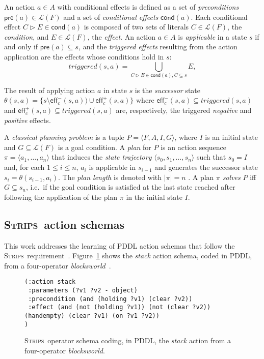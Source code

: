 \documentclass[3p,times]{elsarticle}
\newcommand{\pre}{\mathsf{pre}}  %
\newcommand{\eff}{\mathsf{eff}}  %
\newcommand{\cond}{\mathsf{cond}}   %
\newcommand{\strips}{\textsc{Strips}}     %
\newcommand{\tup}[1]{{\langle #1 \rangle}}
\begin{document}
An action $a\in A$ with conditional effects is defined as a set of {\em preconditions} $\pre(a)\in\mathcal{L}(F)$ and a set of {\em conditional effects} $\cond(a)$. Each conditional effect $C\rhd E\in\cond(a)$ is composed of two sets of literals $C\in\mathcal{L}(F)$, the {\em condition}, and $E\in\mathcal{L}(F)$, the {\em effect}. An action $a\in A$ is {\em applicable} in a state $s$ if and only if $\pre(a)\subseteq s$, and the {\em triggered effects} resulting from the action application are the effects whose conditions hold in $s$:
\[
triggered(s,a)=\bigcup_{C\rhd E\in\cond(a),C\subseteq s} E,
\]

The result of applying action $a$ in state $s$ is the {\em successor} state $\theta(s,a)=\{s\setminus\eff_c^-(s,a))\cup\eff_c^+(s,a)\}$ where $\eff_c^-(s,a)\subseteq triggered(s,a)$ and $\eff_c^+(s,a)\subseteq triggered(s,a)$ are, respectively, the triggered {\em negative} and {\em positive} effects.


A {\em classical planning problem} is a tuple $P=\tup{F,A,I,G}$, where $I$ is an initial state and $G\subseteq\mathcal{L}(F)$ is a goal condition. A {\em plan} for $P$ is an action sequence $\pi=\tup{a_1, \ldots, a_n}$ that induces the {\em state trajectory} $\tup{s_0, s_1, \ldots, s_n}$ such that $s_0=I$ and, for each {\small $1\leq i\leq n$}, $a_i$ is applicable in $s_{i-1}$ and generates the successor state $s_i=\theta(s_{i-1},a_i)$. The {\em plan length} is denoted with $|\pi|=n$ . A plan $\pi$ {\em solves} $P$ iff $G\subseteq s_n$, i.e.~if the goal condition is satisfied at the last state reached after following the application of the plan $\pi$ in the initial state $I$.


\subsection{\strips\ action schemas}
This work addresses the learning of PDDL action schemas that follow the \strips\ requirement~\cite{mcdermott1998pddl,fox2003pddl2}. Figure~\ref{fig:stack} shows the {\em stack} action schema, coded in PDDL, from a four-operator {\em blocksworld}~\cite{slaney2001blocks}.

\begin{figure}[hbt!]
\begin{footnotesize}
\begin{verbatim}
(:action stack
 :parameters (?v1 ?v2 - object)
 :precondition (and (holding ?v1) (clear ?v2))
 :effect (and (not (holding ?v1)) (not (clear ?v2)) (handempty) (clear ?v1) (on ?v1 ?v2))
)
\end{verbatim}
\end{footnotesize}
 \caption{\small \strips\ operator schema coding, in PDDL, the {\em stack} action from a four-operator {\em blocksworld}.}
\label{fig:stack}
\end{figure}
\end{document}
